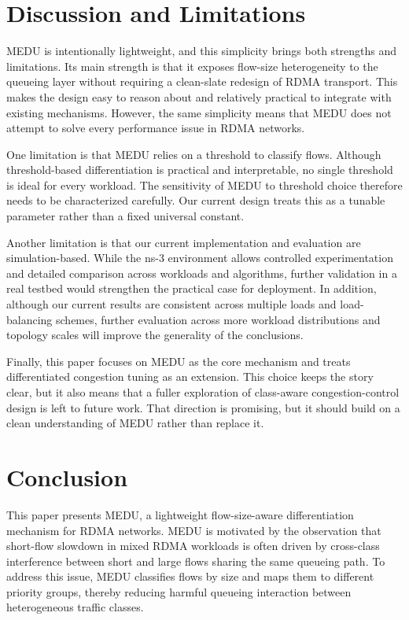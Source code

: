 \documentclass[conference]{IEEEtran}
\begin{document}
\section{Discussion and Limitations}

MEDU is intentionally lightweight, and this simplicity brings both strengths and limitations. Its main strength is that it exposes flow-size heterogeneity to the queueing layer without requiring a clean-slate redesign of RDMA transport. This makes the design easy to reason about and relatively practical to integrate with existing mechanisms. However, the same simplicity means that MEDU does not attempt to solve every performance issue in RDMA networks.

One limitation is that MEDU relies on a threshold to classify flows. Although threshold-based differentiation is practical and interpretable, no single threshold is ideal for every workload. The sensitivity of MEDU to threshold choice therefore needs to be characterized carefully. Our current design treats this as a tunable parameter rather than a fixed universal constant.

Another limitation is that our current implementation and evaluation are simulation-based. While the ns-3 environment allows controlled experimentation and detailed comparison across workloads and algorithms, further validation in a real testbed would strengthen the practical case for deployment. In addition, although our current results are consistent across multiple loads and load-balancing schemes, further evaluation across more workload distributions and topology scales will improve the generality of the conclusions.

Finally, this paper focuses on MEDU as the core mechanism and treats differentiated congestion tuning as an extension. This choice keeps the story clear, but it also means that a fuller exploration of class-aware congestion-control design is left to future work. That direction is promising, but it should build on a clean understanding of MEDU rather than replace it.

\section{Conclusion}

This paper presents MEDU, a lightweight flow-size-aware differentiation mechanism for RDMA networks. MEDU is motivated by the observation that short-flow slowdown in mixed RDMA workloads is often driven by cross-class interference between short and large flows sharing the same queueing path. To address this issue, MEDU classifies flows by size and maps them to different priority groups, thereby reducing harmful queueing interaction between heterogeneous traffic classes.
\end{document}
